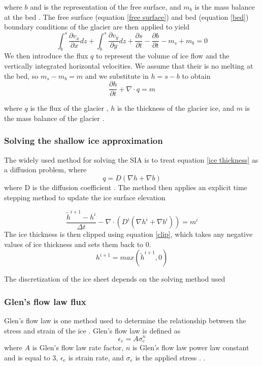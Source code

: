 \documentclass{article}
\begin{document}
where $b$ and is the representation of the free surface, and $m_b$ is the mass balance at the bed \citep{LEMEUR2004, Greve2009}. The free surface (equation \ref{free surface}) and bed (equation \ref{bed}) boundary conditions of the glacier are then applied to yield
\begin{equation}
    \int_b^s \frac{\partial v_x}{\partial x}dz+\int_b^s \frac{\partial v_y}{\partial y}dz+ \frac{\partial s}{\partial t}-\frac{\partial b}{\partial t} -m_s+m_b = 0
\end{equation}
We then introduce the flux $q$ to represent the volume of ice flow and the vertically integrated horizontal velocities. We assume that their is no melting at the bed, so $m_s-m_b=m$ and we substitute in $h = s-b$ to obtain
\begin{equation}\label{ice thickness}
\frac{\partial h}{\partial t} + \nabla \cdot q = m
\end{equation}


where $q$ is the flux of the glacier , $h$ is the thickness of the glacier ice, and $m$ is the mass balance of the glacier \citep{Jarosch2013,Greve2009}.
\subsubsection{Solving the shallow ice approximation}
The widely used method for solving the SIA is to treat equation \ref{ice thickness} as a diffusion problem, where 
\begin{equation} \label{diffusion1}
    q= D(\nabla h + \nabla b)
\end{equation}
where D is the diffusion coefficient \cite{Jarosch2013}. The method then applies an explicit time stepping method to update the ice surface elevation

\begin{equation} \label{timestep}
\frac{\tilde{h}^{i+1}-h^i}{\Delta t} - \nabla \cdot (D^i (\nabla h^{i} + \nabla b^{i})) = m^i
\end{equation}
The ice thickness is then clipped using equation \ref{clip}, which takes any negative values of ice thickness and sets them back to 0. 
\begin{equation}\label{clip}
h^{i+1}=max(\tilde{h}^{i+1},0)
\end{equation}

The discretization of the ice sheet depends on the solving method used

\subsubsection{Glen's flow law flux}
Glen's flow law is one method used to determine the relationship between the stress and strain of the ice  \citep{AHLKRONA2016}. Glen's flow law is defined as
\begin{equation}\label{Glen}
\epsilon_e = A \sigma^n_e
\end{equation}
where $A$ is Glen’s flow law rate factor, $n$ is Glen’s flow law power law constant and is equal to 3, $\epsilon_e$ is strain rate, and $\sigma_e$ is the applied stress \citep{Hooke2013, Nye1952}. \citep{Jarosch2013, AHLKRONA2016}.
\end{document}
